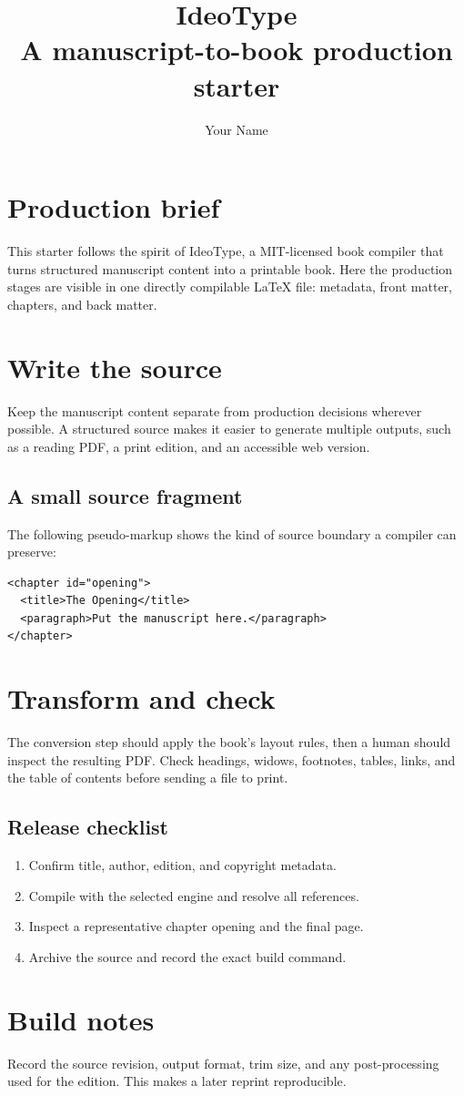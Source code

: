 \documentclass[11pt,oneside]{book}
\title{IdeoType\\[0.4em]\large A manuscript-to-book production starter}
\author{Your Name}
\date{}
\begin{document}
\frontmatter
\maketitle
\chapter*{Production brief}
This starter follows the spirit of IdeoType, a MIT-licensed book compiler that turns structured manuscript content into a printable book. Here the production stages are visible in one directly compilable LaTeX file: metadata, front matter, chapters, and back matter.
\tableofcontents
\mainmatter
\chapter{Write the source}
Keep the manuscript content separate from production decisions wherever possible. A structured source makes it easier to generate multiple outputs, such as a reading PDF, a print edition, and an accessible web version.
\section{A small source fragment}
The following pseudo-markup shows the kind of source boundary a compiler can preserve:
\begin{lstlisting}
<chapter id="opening">
  <title>The Opening</title>
  <paragraph>Put the manuscript here.</paragraph>
</chapter>
\end{lstlisting}
\chapter{Transform and check}
The conversion step should apply the book's layout rules, then a human should inspect the resulting PDF. Check headings, widows, footnotes, tables, links, and the table of contents before sending a file to print.
\section{Release checklist}
\begin{enumerate}
\item Confirm title, author, edition, and copyright metadata.
\item Compile with the selected engine and resolve all references.
\item Inspect a representative chapter opening and the final page.
\item Archive the source and record the exact build command.
\end{enumerate}
\backmatter
\chapter*{Build notes}
Record the source revision, output format, trim size, and any post-processing used for the edition. This makes a later reprint reproducible.
\end{document}
